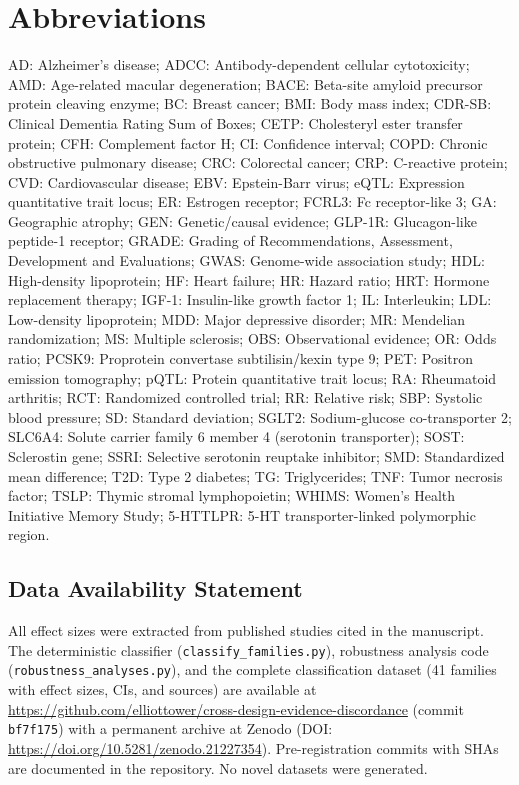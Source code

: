 \documentclass[11pt]{article}
\begin{document}
\section*{Abbreviations}
AD: Alzheimer's disease;
ADCC: Antibody-dependent cellular cytotoxicity;
AMD: Age-related macular degeneration;
BACE: Beta-site amyloid precursor protein cleaving enzyme;
BC: Breast cancer;
BMI: Body mass index;
CDR-SB: Clinical Dementia Rating Sum of Boxes;
CETP: Cholesteryl ester transfer protein;
CFH: Complement factor H;
CI: Confidence interval;
COPD: Chronic obstructive pulmonary disease;
CRC: Colorectal cancer;
CRP: C-reactive protein;
CVD: Cardiovascular disease;
EBV: Epstein-Barr virus;
eQTL: Expression quantitative trait locus;
ER: Estrogen receptor;
FCRL3: Fc receptor-like 3;
GA: Geographic atrophy;
GEN: Genetic/causal evidence;
GLP-1R: Glucagon-like peptide-1 receptor;
GRADE: Grading of Recommendations, Assessment, Development and Evaluations;
GWAS: Genome-wide association study;
HDL: High-density lipoprotein;
HF: Heart failure;
HR: Hazard ratio;
HRT: Hormone replacement therapy;
IGF-1: Insulin-like growth factor 1;
IL: Interleukin;
LDL: Low-density lipoprotein;
MDD: Major depressive disorder;
MR: Mendelian randomization;
MS: Multiple sclerosis;
OBS: Observational evidence;
OR: Odds ratio;
PCSK9: Proprotein convertase subtilisin/kexin type 9;
PET: Positron emission tomography;
pQTL: Protein quantitative trait locus;
RA: Rheumatoid arthritis;
RCT: Randomized controlled trial;
RR: Relative risk;
SBP: Systolic blood pressure;
SD: Standard deviation;
SGLT2: Sodium-glucose co-transporter 2;
SLC6A4: Solute carrier family 6 member 4 (serotonin transporter);
SOST: Sclerostin gene;
SSRI: Selective serotonin reuptake inhibitor;
SMD: Standardized mean difference;
T2D: Type 2 diabetes;
TG: Triglycerides;
TNF: Tumor necrosis factor;
TSLP: Thymic stromal lymphopoietin;
WHIMS: Women's Health Initiative Memory Study;
5-HTTLPR: 5-HT transporter-linked polymorphic region.

\subsection*{Data Availability Statement}
All effect sizes were extracted from published studies cited in the manuscript. The deterministic classifier (\texttt{classify\_families.py}), robustness analysis code (\texttt{robustness\_analyses.py}), and the complete classification dataset (41 families with effect sizes, CIs, and sources) are available at \url{https://github.com/elliottower/cross-design-evidence-discordance} (commit \texttt{bf7f175}) with a permanent archive at Zenodo (DOI: \url{https://doi.org/10.5281/zenodo.21227354}). Pre-registration commits with SHAs are documented in the repository. No novel datasets were generated.
\end{document}
